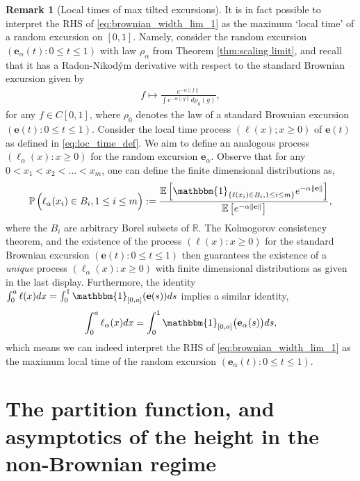 \documentclass{article}
\newcommand{\pr}{\mathbb{P}}								%
\newcommand{\Prob}[1]{\pr\left(#1\right)}					%
\newcommand{\E}{\mathbb{E}}								%
\newcommand{\Exp}[1]{\E\left[#1\right]}					%
\newcommand{\1}{\mathbbm{1}}								%
\newcommand{\ind}[1]{\1_{\{#1\}}}	%
\newcommand{\indE}[1]{\1_{#1}}					%
\theoremstyle{definition}
\newtheorem{remark}[theorem]{Remark}
\numberwithin{equation}{section}
\newcommand{\R}{\mathbb R}
\begin{document}
\begin{remark}[Local times of max tilted excursions]
    It is in fact possible to interpret the RHS of \eqref{eq:brownian_width_lim_1} as the maximum `local time' of a random excursion on $[0,1]$. Namely, consider the random excursion $(\mathbf{e}_{\alpha}(t):0\leq t \leq 1)$ with law $\rho_{\alpha}$ from Theorem \ref{thm:scaling limit}, and recall that it has a Radon-Nikodým derivative with respect to the standard Brownian excursion given by
    \begin{align*}
      f \mapsto  \frac{e^{-\alpha\|f\|}}{\int e^{-\alpha \|g\|}d\rho_0(g)},
    \end{align*}
    for any $f \in C[0,1]$, where $\rho_0$ denotes the law of a standard Brownian excursion $(\mathbf{e}(t):0\leq t\leq 1)$. Consider the local time process $(\ell(x);x\geq 0)$ of $\mathbf{e}(t)$ {as defined in \eqref{eq:loc_time_def}}. We aim to define an analogous process $(\ell_{\alpha}(x):x\geq 0)$ for the random excursion $\mathbf{e}_{\alpha}$. Observe that for any $0<x_1<x_2<\dots <x_m$, one can define the finite dimensional distributions as,
    \begin{align*}
        \Prob{\Big.\ell_{\alpha}(x_i)\in B_i,1\leq i \leq m}:=\frac{\Exp{\ind{\ell(x_i)\in B_i, 1\leq i \leq m}e^{-\alpha \|\mathbf{e}\|}}}{\Exp{e^{-\alpha \|\mathbf{e}\|}}},
    \end{align*}
where the $B_i$ are arbitrary Borel subsets of $\R$. The Kolmogorov consistency theorem, and the existence of the process $(\ell(x):x\geq 0)$ for the standard Brownian excursion $(\mathbf{e}(t):0\leq t\leq 1)$ then guarantees the existence of a \emph{unique} process $(\ell_{\alpha}(x):x\geq 0)$ with finite dimensional distributions as given in the last display. Furthermore, the identity $\int_0^a \ell(x)dx=\int_0^1\indE{[0,a]}(\mathbf{e}(s))ds$ implies a similar identity,
\begin{align*}
    \int_0^a\ell_{\alpha}(x)dx=\int_0^1\indE{[0,a]}\big(\mathbf{e}_{\alpha}(s)\big)ds,
\end{align*}
which means we can indeed interpret the RHS of \eqref{eq:brownian_width_lim_1} as the maximum local time of the random excursion $(\mathbf{e}_{\alpha}(t):0\leq t \leq 1)$.
\end{remark}

\section{The partition function, and asymptotics of the height in the non-Brownian regime}\label{sec:inter_height}
\end{document}

